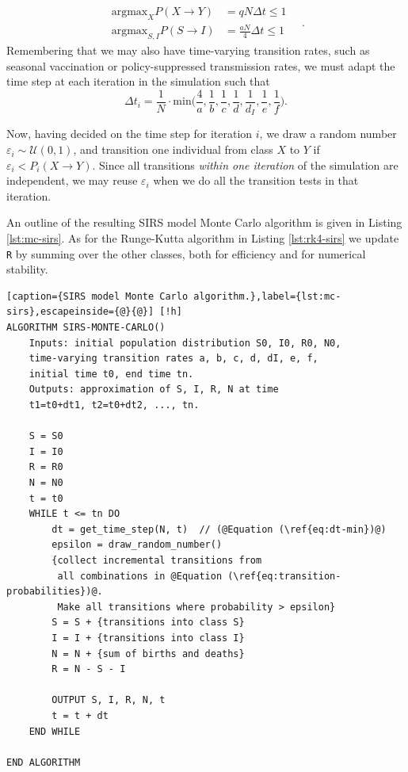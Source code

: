 \documentclass[]{article}
\begin{document}
\begin{equation}
\begin{aligned}
	\mathrm{argmax}_X  P(X \rightarrow Y) &= qN \Delta t \le 1 \\
	\mathrm{argmax}_{S,I} P(S \rightarrow I) &= \frac{aN}{4} \Delta t \le 1
\end{aligned} \quad .
\end{equation}
Remembering that we may also have time-varying transition rates, such as seasonal vaccination or policy-suppressed transmission rates, we must adapt the time step at each iteration in the simulation such that
\begin{equation} \label{eq:dt-min}
	\Delta t_i = \frac{1}{N} \cdot \mathrm{min} \bigg( \frac{4}{a}, \frac{1}{b}, \frac{1}{c}, \frac{1}{d}, \frac{1}{d_I}, \frac{1}{e}, \frac{1}{f} \bigg).
\end{equation}

Now, having decided on the time step for iteration $i$, we draw a random number $\varepsilon_i \sim \mathcal{U}(0,1)$, and transition one individual from class $X$ to $Y$ if $\varepsilon_i < P_i(X \rightarrow Y)$. Since all transitions \textit{within one iteration} of the simulation are independent, we may reuse $\varepsilon_i$ when we do all the transition tests in that iteration. 

An outline of the resulting SIRS model Monte Carlo algorithm is given in Listing \ref{lst:mc-sirs}. As for the Runge-Kutta algorithm in Listing \ref{lst:rk4-sirs} we update \lstinline|R| by summing over the other classes, both for efficiency and for numerical stability.

\begin{lstlisting}[caption={SIRS model Monte Carlo algorithm.},label={lst:mc-sirs},escapeinside={@}{@}] [!h]
ALGORITHM SIRS-MONTE-CARLO()
	Inputs: initial population distribution S0, I0, R0, N0,
	time-varying transition rates a, b, c, d, dI, e, f,
	initial time t0, end time tn.
	Outputs: approximation of S, I, R, N at time
	t1=t0+dt1, t2=t0+dt2, ..., tn.
	
	S = S0
	I = I0
	R = R0
	N = N0
	t = t0
	WHILE t <= tn DO
		dt = get_time_step(N, t)  // (@Equation (\ref{eq:dt-min})@)
		epsilon = draw_random_number()
		{collect incremental transitions from 
		 all combinations in @Equation (\ref{eq:transition-probabilities})@.
		 Make all transitions where probability > epsilon}
		S = S + {transitions into class S}
		I = I + {transitions into class I}
		N = N + {sum of births and deaths}
		R = N - S - I
		
		OUTPUT S, I, R, N, t
		t = t + dt
	END WHILE

END ALGORITHM
\end{lstlisting}
\end{document}
